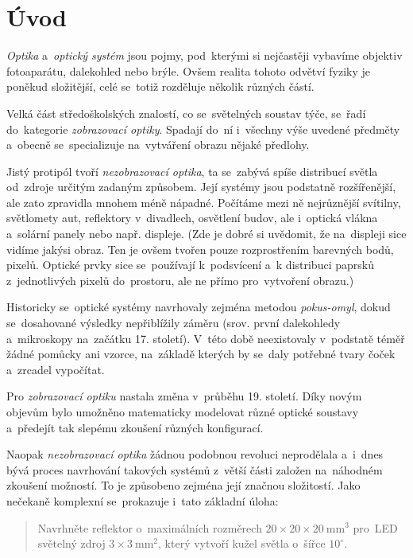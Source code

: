 \chapter{Úvod}

\emph{Optika} a~\emph{optický systém} jsou pojmy, pod~kterými si nejčastěji vybavíme objektiv fotoaparátu, dalekohled nebo brýle. Ovšem realita tohoto odvětví fyziky je poněkud složitější, celé se~totiž rozděluje několik různých částí.

Velká část středoškolských znalostí, co se~světelných soustav týče, se~řadí do~kategorie \emph{zobrazovací optiky}. Spadají do~ní i~všechny výše uvedené předměty a~obecně se~specializuje na~vytváření obrazu nějaké předlohy.

Jistý protipól tvoří \emph{nezobrazovací optika}, ta se~zabývá spíše distribucí světla od~zdroje určitým zadaným způsobem. Její systémy jsou podstatně rozšířenější, ale zato zpravidla mnohem méně nápadné. Počítáme mezi ně nejrůznější svítilny, světlomety aut, reflektory v~divadlech, osvětlení budov, ale i~optická vlákna a~solární panely nebo např. displeje. (Zde je dobré si uvědomit, že na~displeji sice vidíme jakýsi obraz. Ten je ovšem tvořen pouze rozprostřením barevných bodů, pixelů. Optické prvky sice se~používají k~podsvícení a~k distribuci paprsků z~jednotlivých pixelů do~prostoru, ale ne přímo pro~vytvoření obrazu.)

Historicky se~optické systémy navrhovaly zejména metodou \emph{pokus-omyl}, dokud se~dosahované výsledky nepřiblížily záměru (srov. první dalekohledy a~mikroskopy na~začátku 17. století). V~této době neexistovaly v~podstatě téměř žádné pomůcky ani vzorce, na~základě kterých by se~daly potřebné tvary čoček a~zrcadel vypočítat. 

Pro \emph{zobrazovací optiku} nastala změna v~průběhu 19. století. Díky novým objevům bylo umožněno matematicky modelovat různé optické soustavy a~předejít tak slepému zkoušení různých konfigurací. \parencite{hannavy2008encyclopedia,wimmer2017carl}

Naopak \emph{nezobrazovací optika} žádnou podobnou revoluci neprodělala a~i~dnes bývá proces navrhování takových systémů z~větší části založen na~náhodném zkoušení možností. To je způsobeno zejména její značnou složitostí. Jako nečekaně komplexní se~prokazuje i~tato základní úloha:

\begin{quote}
    Navrhněte reflektor o~maximálních rozměrech $20\times20\times20\ \mathrm{mm^3}$ pro~LED světelný zdroj $3\times3\ \mathrm{mm^2}$, který vytvoří kužel světla o~šířce $10^{\circ}$.
\end{quote}

